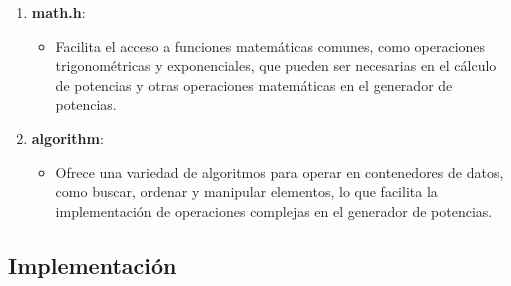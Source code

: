\documentclass{article}
\begin{document}
\begin{enumerate}
            \item \textbf{math.h}:
            \begin{itemize}
                \item Facilita el acceso a funciones matemáticas comunes, como operaciones trigonométricas y exponenciales, que
                pueden ser necesarias en el cálculo de potencias y otras operaciones matemáticas en el generador de potencias.
            \end{itemize}

            \item \textbf{algorithm}:
            \begin{itemize}
                \item Ofrece una variedad de algoritmos para operar en contenedores de datos, como buscar, ordenar y
                manipular elementos, lo que facilita la implementación de operaciones complejas en el generador de potencias.
            \end{itemize}
        \end{enumerate}

    \subsection{Implementación}
\end{document}
